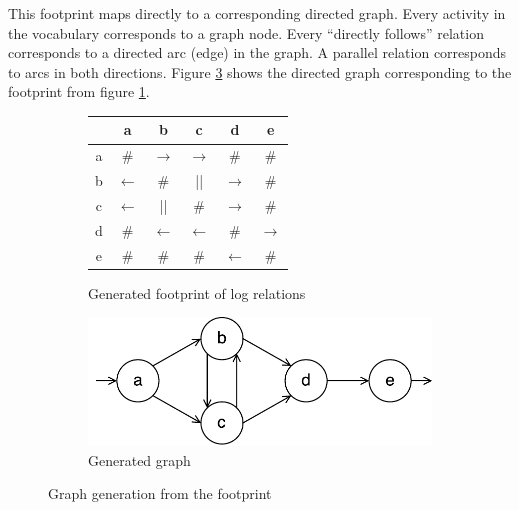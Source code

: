This footprint maps directly to a corresponding directed graph.
Every activity in the vocabulary corresponds to a graph node.
Every ``directly follows'' relation corresponds to a directed arc (edge) in the graph. A parallel relation corresponds to arcs in both directions.
Figure \ref{fig:examplegraph} shows the directed graph corresponding to the footprint from figure \ref{tab:examplefootprint}.

\begin{figure}
    \centering
    \begin{subfigure}[h]{0.4\linewidth}
        \begin{center}
        \begin{tabular}{cccccc}
        \hline
          & a & b & c & d & e\\
        \hline
        a & \# & $\rightarrow$ & $\rightarrow$ & \# & \# \\
        b & $\leftarrow$ & \# & || & $\rightarrow$ & \# \\
        c & $\leftarrow$ & || & \# & $\rightarrow$ & \# \\
        d & \# & $\leftarrow$ & $\leftarrow$ & \# & $\rightarrow$ \\
        e & \# & \# & \# & $\leftarrow$ & \# \\
        \hline
        \end{tabular}
        \end{center}
        \caption{Generated footprint of log relations}
        \label{tab:examplefootprint}
    \end{subfigure}
    \begin{subfigure}[h]{0.4\linewidth}
        \centering \includegraphics[width=\linewidth]{gfx/figures/graphthing.pdf}
        \caption{Generated graph}
        \label{fig:examplegraph}
    \end{subfigure}
    \caption{Graph generation from the footprint}
\end{figure}


